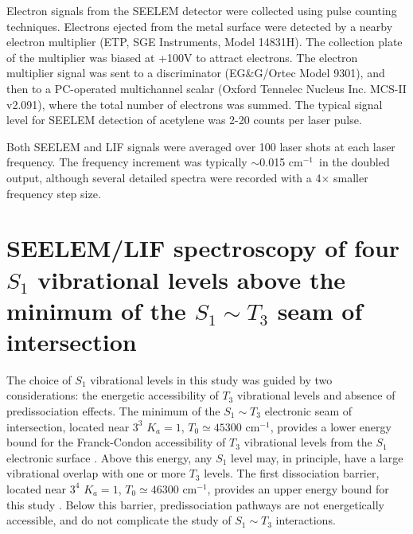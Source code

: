 \documentclass[12pt]{mitthesis}
\newcommand{\rcm}{cm$^{-1}$}
\newcommand{\Ka}[1]{$K_a\!\!=\!#1$}
\begin{document}
Electron signals from the SEELEM detector were collected using pulse
counting techniques.  Electrons ejected from the metal surface were
detected by a nearby electron multiplier (ETP, SGE Instruments, Model
14831H).  The collection plate of the multiplier was biased at +100V
to attract electrons.  The electron multiplier signal was sent to a
discriminator (EG\&G/Ortec Model 9301), and then to a PC-operated
multichannel scalar (Oxford Tennelec Nucleus Inc. MCS-II v2.091),
where the total number of electrons was summed.  The typical signal
level for SEELEM detection of acetylene was 2-20 counts per laser
pulse.

Both SEELEM and LIF signals were averaged over 100 laser shots at each
laser frequency.  The frequency increment was typically $\sim$0.015
\rcm\ in the doubled output, although several detailed spectra were
recorded with a 4$\times$ smaller frequency step size.





























\section{SEELEM/LIF spectroscopy of four $S_1$ vibrational levels
  above the minimum of the $S_1 \sim T_3$ seam of intersection}


The choice of $S_1$ vibrational levels in this study was guided by two
considerations: the energetic accessibility of $T_3$ vibrational
levels \cite{cui97, thom07} and absence of predissociation effects.
The minimum of the $S_1 \sim T_3$ electronic seam of intersection,
located near $3^3$ \Ka{1}, $T_0 \simeq 45300$ \rcm, provides a lower
energy bound for the Franck-Condon accessibility of $T_3$ vibrational
levels from the $S_1$ electronic surface \cite{cui97}.  Above this
energy, any $S_1$ level may, in principle, have a large vibrational
overlap with one or more $T_3$ levels.  The first dissociation
barrier, located near $3^4$ \Ka{1}, $T_0 \simeq 46300$ \rcm, provides
an upper energy bound for this study \cite{mordaunt98}.  Below this
barrier, predissociation pathways are not energetically accessible,
and do not complicate the study of $S_1 \sim T_3$ interactions.
\end{document}
